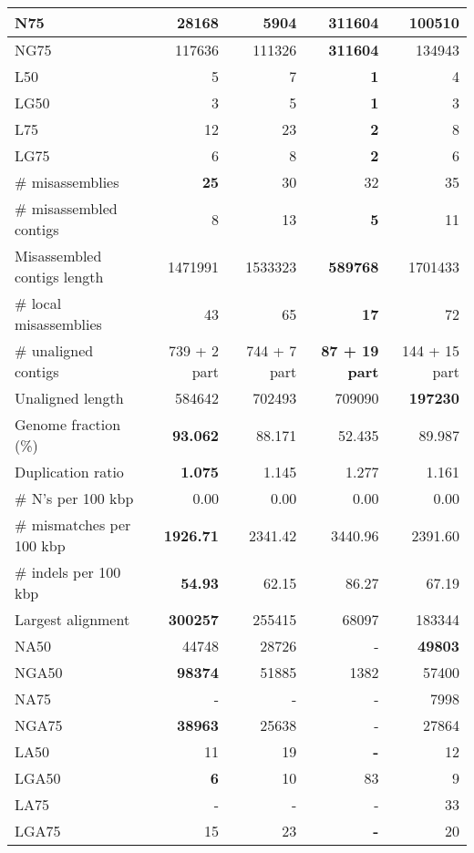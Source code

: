 \documentclass[12pt,a4paper]{article}
\begin{document}
\begin{table}[ht]
\begin{center}
\begin{tabular}{|l*{4}{|r}|}
N75 & 28168 & 5904 & {\bf 311604} & 100510 \\ \hline
NG75 & 117636 & 111326 & {\bf 311604} & 134943 \\ \hline
L50 & 5 & 7 & {\bf 1} & 4 \\ \hline
LG50 & 3 & 5 & {\bf 1} & 3 \\ \hline
L75 & 12 & 23 & {\bf 2} & 8 \\ \hline
LG75 & 6 & 8 & {\bf 2} & 6 \\ \hline
\# misassemblies & {\bf 25} & 30 & 32 & 35 \\ \hline
\# misassembled contigs & 8 & 13 & {\bf 5} & 11 \\ \hline
Misassembled contigs length & 1471991 & 1533323 & {\bf 589768} & 1701433 \\ \hline
\# local misassemblies & 43 & 65 & {\bf 17} & 72 \\ \hline
\# unaligned contigs & 739 + 2 part & 744 + 7 part & {\bf 87 + 19 part} & 144 + 15 part \\ \hline
Unaligned length & 584642 & 702493 & 709090 & {\bf 197230} \\ \hline
Genome fraction (\%) & {\bf 93.062} & 88.171 & 52.435 & 89.987 \\ \hline
Duplication ratio & {\bf 1.075} & 1.145 & 1.277 & 1.161 \\ \hline
\# N's per 100 kbp & 0.00 & 0.00 & 0.00 & 0.00 \\ \hline
\# mismatches per 100 kbp & {\bf 1926.71} & 2341.42 & 3440.96 & 2391.60 \\ \hline
\# indels per 100 kbp & {\bf 54.93} & 62.15 & 86.27 & 67.19 \\ \hline
Largest alignment & {\bf 300257} & 255415 & 68097 & 183344 \\ \hline
NA50 & 44748 & 28726 & - & {\bf 49803} \\ \hline
NGA50 & {\bf 98374} & 51885 & 1382 & 57400 \\ \hline
NA75 & - & - & - & 7998 \\ \hline
NGA75 & {\bf 38963} & 25638 & - & 27864 \\ \hline
LA50 & 11 & 19 & {\bf -} & 12 \\ \hline
LGA50 & {\bf 6} & 10 & 83 & 9 \\ \hline
LA75 & - & - & - & 33 \\ \hline
LGA75 & 15 & 23 & {\bf -} & 20 \\ \hline
\end{tabular}
\end{center}
\end{table}
\end{document}
